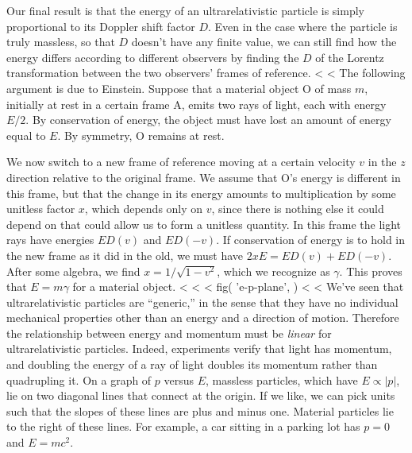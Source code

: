 Our final result is that the energy of an ultrarelativistic particle is simply proportional
to its Doppler shift factor $D$. Even in the case where the particle is truly massless,
so that $D$ doesn't have any finite value, we can still
find how the energy differs according to different observers by finding the $D$ of the
Lorentz transformation between the two observers' frames of reference.
<%
<%
The following argument is due to Einstein. Suppose that a material object O of mass $m$,
initially at rest in a certain frame A, emits two rays of light, each with energy $E/2$. By
conservation of energy, the object must have lost an amount of energy equal to $E$.
By symmetry, O remains at rest.

We now switch to a new frame of reference moving at a certain velocity $v$ in the $z$ direction relative to the original frame.
We assume that O's energy is different in this frame, but that the change in its energy amounts to multiplication by some unitless factor $x$,
which depends only on $v$, since there is nothing else it could depend on that could allow us to form a unitless quantity. In this frame the light rays have energies $ED(v)$ and
$ED(-v)$. If conservation of energy is to hold in the new frame as it did in the old, we must have $2xE=ED(v)+ED(-v)$.
After some algebra, we find $x=1/\sqrt{1-v^2}$, which we recognize as $\gamma$. This proves that
$E=m\gamma$ for a material object.
<%
<%
<%
  fig(
    'e-p-plane',
  )
<%
<%
We've seen that ultrarelativistic particles are ``generic,''
in the sense that they have no individual mechanical properties other than an energy and a direction
of motion. Therefore the relationship between energy and momentum must be \emph{linear}
for ultrarelativistic particles. Indeed, experiments verify that light has momentum, and
doubling the energy of a ray of light doubles its momentum rather than quadrupling it.
On a graph of $p$ versus $E$, massless particles, which have $E\propto|p|$, lie on two diagonal lines that connect at the
origin. If we like, we can pick units such that the slopes of these lines are plus and minus one. Material particles
lie to the right of these lines. For example, a car sitting in a parking lot has $p=0$ and $E=mc^2$. 

